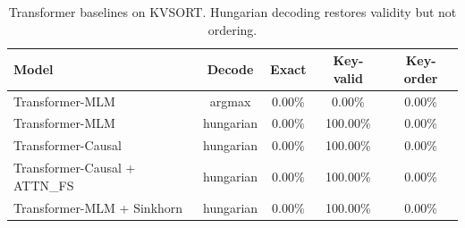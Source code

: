 \begin{table}[t]
\centering
\small
\caption{Transformer baselines on KVSORT. Hungarian decoding restores validity but not ordering.}
\label{tab:appendix-transformer}
\begin{tabular}{lcccc}
\toprule
Model & Decode & Exact & Key-valid & Key-order \\
\midrule
Transformer-MLM & argmax & 0.00\% & 0.00\% & 0.00\% \\
Transformer-MLM & hungarian & 0.00\% & 100.00\% & 0.00\% \\
Transformer-Causal & hungarian & 0.00\% & 100.00\% & 0.00\% \\
Transformer-Causal + ATTN\_FS & hungarian & 0.00\% & 100.00\% & 0.00\% \\
Transformer-MLM + Sinkhorn & hungarian & 0.00\% & 100.00\% & 0.00\% \\
\bottomrule
\end{tabular}
\end{table}

